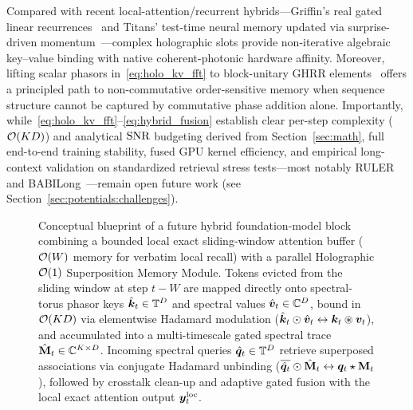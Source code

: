Compared with recent local-attention/recurrent hybrids---Griffin's real gated linear recurrences~\cite{DE_2024_GRIFFIN} and Titans' test-time neural memory updated via surprise-driven momentum~\cite{BEHROUZ_2025_TITANS}---complex holographic slots provide non-iterative algebraic key--value binding with native coherent-photonic hardware affinity.
Moreover, lifting scalar phasors in~\eqref{eq:holo_kv_fft} to block-unitary GHRR elements~\cite{YEUNG_2024_GHRR} offers a principled path to non-commutative order-sensitive memory when sequence structure cannot be captured by commutative phase addition alone.
Importantly, while~\eqref{eq:holo_kv_fft}--\eqref{eq:hybrid_fusion} establish clear per-step complexity ($\mathcal{O}\!\left(KD\right)$) and analytical $\mathrm{SNR}$ budgeting derived from Section~\ref{sec:math}, full end-to-end training stability, fused GPU kernel efficiency, and empirical long-context validation on standardized retrieval stress tests---most notably RULER~\cite{HSIEH_2024_RULER} and BABILong~\cite{KURATOV_2024_BABILONG}---remain open future work (see Section~\ref{sec:potentials:challenges}).

\begin{figure}[t]
    \centering
    \resizebox{\linewidth}{!}{}
    \caption{Conceptual blueprint of a future hybrid foundation-model block combining a bounded local exact sliding-window attention buffer ($\mathcal{O}\!\left(W\right)$ memory for verbatim local recall) with a parallel Holographic $\mathcal{O}\!\left(1\right)$ Superposition Memory Module. Tokens evicted from the sliding window at step $t-W$ are mapped directly onto spectral-torus phasor keys $\hat{\boldsymbol{k}}_t \in \mathbb{T}^D$ and spectral values $\hat{\boldsymbol{v}}_t \in \mathbb{C}^D$, bound in $\mathcal{O}\!\left(KD\right)$ via elementwise Hadamard modulation ($\hat{\boldsymbol{k}}_t \odot \hat{\boldsymbol{v}}_t \leftrightarrow \boldsymbol{k}_t \circledast \boldsymbol{v}_t$), and accumulated into a multi-timescale gated spectral trace $\hat{\mathbf{M}}_t \in \mathbb{C}^{K \times D}$. Incoming spectral queries $\hat{\boldsymbol{q}}_t \in \mathbb{T}^D$ retrieve superposed associations via conjugate Hadamard unbinding ($\overline{\hat{\boldsymbol{q}}_t} \odot \hat{\mathbf{M}}_t \leftrightarrow \boldsymbol{q}_t \star \mathbf{M}_t$), followed by crosstalk clean-up and adaptive gated fusion with the local exact attention output $\boldsymbol{y}_t^{\mathrm{loc}}$.}
    \label{fig:hybrid_arch}
\end{figure}

